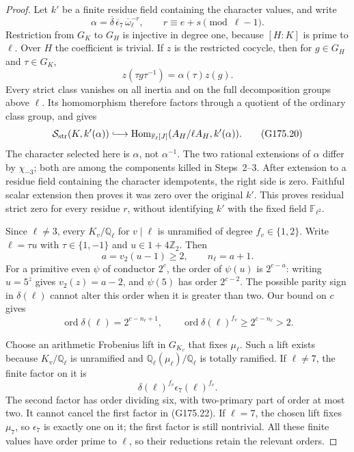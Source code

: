 \begin{proof}
Let $k'$ be a finite residue field containing the character values,
and write
\[
 \alpha=\overline\delta\,\overline\epsilon_7\,
                \overline\omega_\ell^{-r},
                  \qquad r\equiv e+s\pmod{\ell-1}.
 \tag{G175.18}
\]
Restriction from $G_K$ to $G_H$ is injective in degree one,
because $[H:K]$ is prime to $\ell$.
Over $H$ the coefficient is trivial.  If $z$ is the restricted
cocycle, then for $g\in G_H$ and $\tau\in G_K$,
\[
                   z(\tau g\tau^{-1})=\alpha(\tau)z(g).
 \tag{G175.19}
\]
Every strict class vanishes on all inertia and on the full
decomposition groups above $\ell$.  Its homomorphism therefore
factors through a quotient of the ordinary class group, and gives
\[
 \mathcal S_{\rm str}(K,k'(\alpha))\lhook\joinrel\longrightarrow
 \operatorname{Hom}_{\mathbb F_\ell[J]}
                          (A_H/\ell A_H,k'(\alpha)).
 \tag{G175.20}
\]
The character selected here is $\alpha$, not $\alpha^{-1}$.
The two rational extensions of $\alpha$ differ by $\chi_{-3}$;
both are among the components killed in Steps~2--3.
After extension to a residue field containing the character
idempotents, the right side is zero.  Faithful scalar extension
then proves it was zero over the original $k'$.
This proves residual strict zero for every residue $r$, without
identifying $k'$ with the fixed field $\mathbb F_{\ell^2}$.

Since $\ell\ne3$, every $K_v/\mathbb Q_\ell$ for $v\mid\ell$
is unramified of degree $f_v\in\{1,2\}$.
Write $\ell=\tau u$ with $\tau\in\{1,-1\}$ and
$u\in1+4\mathbb Z_2$.  Then
\[
 a=v_2(u-1)\geq2,\qquad n_\ell=a+1.
 \tag{G175.21}
\]
For a primitive even $\psi$ of conductor $2^c$, the order of
$\psi(u)$ is $2^{c-a}$: writing $u=5^z$ gives
$v_2(z)=a-2$, and $\psi(5)$ has order $2^{c-2}$.
The possible parity sign in $\delta(\ell)$ cannot alter this
order when it is greater than two.  Our bound on $c$ gives
\[
 \operatorname{ord}\delta(\ell)=2^{c-n_\ell+1},\qquad
 \operatorname{ord}\delta(\ell)^{f_v}
                            \geq2^{c-n_\ell}>2.
 \tag{G175.22}
\]

Choose an arithmetic Frobenius lift in $G_{K_v}$ that fixes
$\mu_\ell$.  Such a lift exists because $K_v/\mathbb Q_\ell$
is unramified and $\mathbb Q_\ell(\mu_\ell)/\mathbb Q_\ell$
is totally ramified.  If $\ell\ne7$, the finite factor on it is
\[
                        \delta(\ell)^{f_v}\epsilon_7(\ell)^{f_v}.
 \tag{G175.23}
\]
The second factor has order dividing six, with two-primary part
of order at most two.  It cannot cancel the first factor in
(G175.22).  If $\ell=7$, the chosen lift fixes $\mu_7$, so
$\epsilon_7$ is exactly one on it; the first factor is still
nontrivial.  All these finite values have order prime to $\ell$,
so their reductions retain the relevant orders.


\end{proof}

